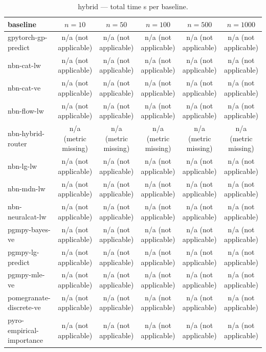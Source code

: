 \begin{table}[h]
\centering
\caption{hybrid — total time s per baseline.}
\label{tab:hybrid_total_time_s}
\begin{tabular}{lccccc}
\toprule
baseline & $n=10$ & $n=50$ & $n=100$ & $n=500$ & $n=1000$ \\
\midrule
gpytorch-gp-predict & n/a (not applicable) & n/a (not applicable) & n/a (not applicable) & n/a (not applicable) & n/a (not applicable) \\
nbn-cat-lw & n/a (not applicable) & n/a (not applicable) & n/a (not applicable) & n/a (not applicable) & n/a (not applicable) \\
nbn-cat-ve & n/a (not applicable) & n/a (not applicable) & n/a (not applicable) & n/a (not applicable) & n/a (not applicable) \\
nbn-flow-lw & n/a (not applicable) & n/a (not applicable) & n/a (not applicable) & n/a (not applicable) & n/a (not applicable) \\
nbn-hybrid-router & n/a (metric missing) & n/a (metric missing) & n/a (metric missing) & n/a (metric missing) & n/a (metric missing) \\
nbn-lg-lw & n/a (not applicable) & n/a (not applicable) & n/a (not applicable) & n/a (not applicable) & n/a (not applicable) \\
nbn-mdn-lw & n/a (not applicable) & n/a (not applicable) & n/a (not applicable) & n/a (not applicable) & n/a (not applicable) \\
nbn-neuralcat-lw & n/a (not applicable) & n/a (not applicable) & n/a (not applicable) & n/a (not applicable) & n/a (not applicable) \\
pgmpy-bayes-ve & n/a (not applicable) & n/a (not applicable) & n/a (not applicable) & n/a (not applicable) & n/a (not applicable) \\
pgmpy-lg-predict & n/a (not applicable) & n/a (not applicable) & n/a (not applicable) & n/a (not applicable) & n/a (not applicable) \\
pgmpy-mle-ve & n/a (not applicable) & n/a (not applicable) & n/a (not applicable) & n/a (not applicable) & n/a (not applicable) \\
pomegranate-discrete-ve & n/a (not applicable) & n/a (not applicable) & n/a (not applicable) & n/a (not applicable) & n/a (not applicable) \\
pyro-empirical-importance & n/a (not applicable) & n/a (not applicable) & n/a (not applicable) & n/a (not applicable) & n/a (not applicable) \\
\bottomrule
\end{tabular}
\end{table}
